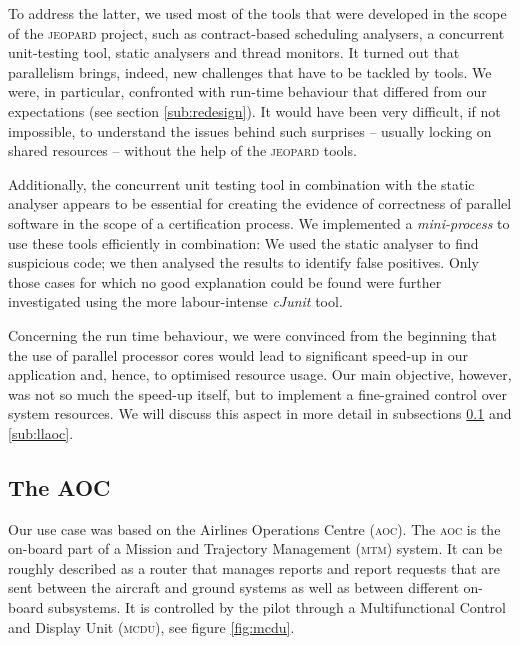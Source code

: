\documentclass{sig-alternate}
\newcommand{\acronym}[1]{\textsc{#1}}
\begin{document}
To address the latter,
we used most of the tools that were
developed in the scope of the \acronym{jeopard} project,
such as contract-based scheduling analysers,
a concurrent unit-testing tool,
static analysers and thread monitors.
It turned out that parallelism brings, indeed,
new challenges that have to be tackled by tools.
We were, in particular, confronted with run-time behaviour
that differed from our expectations 
(see section \ref{sub:redesign}).
It would have been very difficult, if not impossible,
to understand the issues behind such surprises 
-- usually locking on shared resources --
without the help of the \acronym{jeopard} tools.

Additionally, the concurrent unit testing tool
in combination with the static analyser
appears to be essential for creating 
the evidence of correctness of parallel software
in the scope of a certification process.
We implemented a \emph{mini-process} 
to use these tools efficiently in combination:
We used the static analyser to find suspicious code;
we then analysed the results to identify false positives.
Only those cases for which no good explanation could be found
were further investigated using 
the more labour-intense \emph{cJunit} tool.

Concerning the run time behaviour,
we were convinced from the beginning
that the use of parallel processor cores
would lead to significant speed-up in our application and, hence,
to optimised resource usage.
Our main objective, however,
was not so much the speed-up itself,
but to implement a fine-grained control over system resources.
We will discuss this aspect in more detail 
in subsections \ref{sub:aoc} and \ref{sub:llaoc}.

\subsection{The AOC}\label{sub:aoc}
Our use case was based on the 
Airlines Operations Centre (\acronym{aoc}).
The \acronym{aoc} is the on-board part
of a Mission and Trajectory Management (\acronym{mtm}) system.
It can be roughly described as a router
that manages reports and report requests 
that are sent between the aircraft and ground systems
as well as between different on-board subsystems.
It is controlled by the pilot through a 
Multifunctional Control and Display Unit (\acronym{mcdu}),
see figure \ref{fig:mcdu}.

\end{document}

